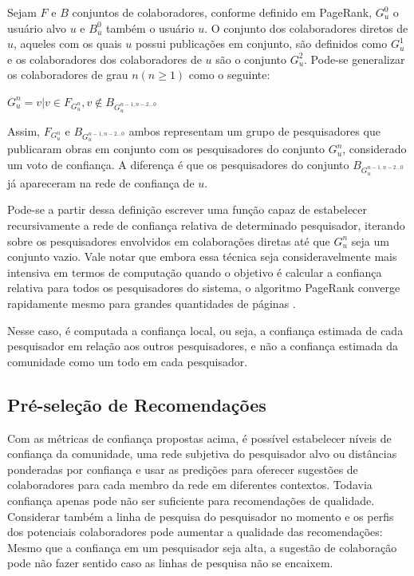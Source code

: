 \documentclass[12pt]{article}
\begin{document}
Sejam $F$ e $B$ conjuntos de colaboradores, conforme definido em PageRank, $G_{u}^{0}$ o usuário alvo $u$ e $B_{u}^{0}$ também o 
usuário $u$. O conjunto dos colaboradores diretos de $u$, aqueles com os quais $u$ possui publicações em conjunto, são definidos 
como $G_{u}^{1}$ e os colaboradores dos colaboradores de $u$ são o conjunto $G_{u}^{2}$. Pode-se generalizar os colaboradores 
de grau $n (n \geq 1)$ como o seguinte:

\begin{center}
  $ G_{u}^{n} = v | v \in F_{G_{u}^{n}}, v \notin B_{G_{u}^{n-1, n-2 \dots 0}} $
\end{center}

Assim, $F_{G_{u}^{n}}$ e $B_{G_{u}^{n-1, n-2 \dots 0}}$ ambos  representam um grupo de pesquisadores que publicaram obras em conjunto 
com os pesquisadores do conjunto $G_{u}^{n}$, considerado um voto de  confiança. A diferença é que os pesquisadores do conjunto 
$B_{G_u^{n-1, n-2 \dots 0}}$ já apareceram na rede de confiança de $u$.

Pode-se a partir dessa definição escrever uma função capaz de estabelecer recursivamente a rede de confiança relativa de 
determinado pesquisador, iterando sobre os pesquisadores envolvidos  em colaborações diretas até que $ G^{n}_{u} $ seja um 
conjunto vazio. Vale notar que embora essa técnica seja consideravelmente mais intensiva em termos de computação quando o objetivo 
é calcular a confiança relativa para todos os pesquisadores do sistema, o algoritmo PageRank converge rapidamente mesmo para 
grandes quantidades de páginas \cite{page1999pagerank}.

Nesse caso, é computada a confiança local, ou seja, a confiança estimada de cada pesquisador em relação aos outros pesquisadores, 
e não a confiança estimada da comunidade como um todo em cada pesquisador.

\subsection{Pré-seleção de Recomendações} \label{sect:pre-selection}

Com as métricas de confiança propostas acima, é possível estabelecer níveis de confiança da comunidade, uma rede subjetiva do 
pesquisador alvo ou distâncias ponderadas por confiança e usar as predições para oferecer sugestões de colaboradores para cada 
membro da rede em diferentes contextos. Todavia confiança apenas pode não ser suficiente para recomendações de qualidade. 
Considerar também a linha de pesquisa do pesquisador no momento e os perfis dos potenciais colaboradores pode aumentar a qualidade 
das recomendações: Mesmo que a confiança em um pesquisador seja alta, a sugestão de colaboração pode não fazer sentido caso as 
linhas de pesquisa não se encaixem.
\end{document}
